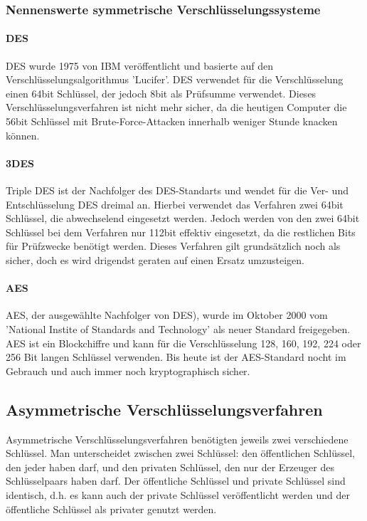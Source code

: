\documentclass[12pt,a4paper]{report}
\begin{document}
\subsubsection{Nennenswerte symmetrische Verschlüsselungssysteme}

\paragraph{DES}

DES wurde 1975 von IBM veröffentlicht und basierte auf den Verschlüsselungsalgorithmus 'Lucifer'. DES verwendet für die Verschlüsselung einen 64bit Schlüssel, der jedoch 8bit als Prüfsumme verwendet. Dieses Verschlüsselungsverfahren ist nicht mehr sicher, da die heutigen Computer die 56bit Schlüssel mit Brute-Force-Attacken innerhalb weniger Stunde knacken können.

\paragraph{3DES}

Triple DES ist der Nachfolger des DES-Standarts und wendet für die Ver- und Entschlüsselung DES dreimal an. Hierbei verwendet das Verfahren zwei 64bit Schlüssel, die abwechselend eingesetzt werden. Jedoch werden von den zwei 64bit Schlüssel bei dem Verfahren nur 112bit effektiv eingesetzt, da die restlichen Bits für Prüfzwecke benötigt werden. Dieses Verfahren gilt grundsätzlich noch als sicher,
doch es wird drigendst geraten auf einen Ersatz umzusteigen.

\paragraph{AES}

AES, der ausgewählte Nachfolger von DES), wurde im Oktober 2000 vom 'National Instite of Standards and Technology' als neuer Standard freigegeben. AES ist ein Blockchiffre und kann für die Verschlüsselung 128, 160, 192, 224 oder 256 Bit langen Schlüssel verwenden. Bis heute ist der AES-Standard nocht im Gebrauch und auch immer noch kryptographisch sicher.

\subsection{Asymmetrische Verschlüsselungsverfahren}

Asymmetrische Verschlüsselungsverfahren benötigten jeweils zwei verschiedene Schlüssel. Man unterscheidet zwischen zwei Schlüssel: den öffentlichen Schlüssel, den jeder haben darf, und den privaten Schlüssel, den nur der Erzeuger des Schlüsselpaars haben darf. Der öffentliche Schlüssel und private Schlüssel sind identisch, d.h. es kann auch der private Schlüssel veröffentlicht werden und der öffentliche Schlüssel als privater genutzt werden.
\end{document}

